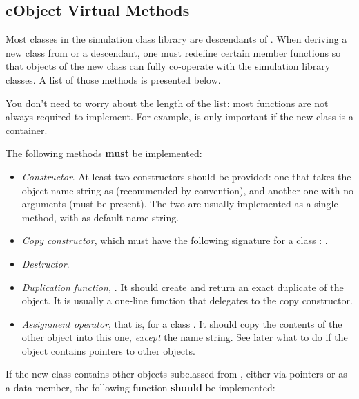 \subsection{cObject Virtual Methods}
\label{sec:sim-lib:cobject-virtual-methods}

Most classes in the simulation class library are descendants of
. When deriving a new class from 
or a  descendant, one must redefine certain member
functions so that objects of the new class can fully co-operate
with the simulation library classes. A list of those methods is
presented below.

\begin{note}
You don't need to worry about the length of the list: most functions
are not always required to implement. For example, 
is only important if the new class is a container.
\end{note}

The following methods \textbf{must} be implemented:

\begin{itemize}
  \item \textit{Constructor}. At least two constructors should be provided:
        one that takes the object name string as 
        (recommended by convention), and another one with no arguments
        (must be present). The two are usually implemented as a single
        method, with  as default name string.
  \item \textit{Copy constructor}, which must have the following signature
        for a class : .
  \item \textit{Destructor}.
  \item \textit{Duplication function,} .
        It should create and return an exact duplicate of the object.
        It is usually a one-line function that delegates to the copy constructor.
  \item \textit{Assignment operator}, that is, 
        for a class . It should copy the contents of the other
        object into this one, \textit{except} the name string. See later what to do
        if the object contains pointers to other objects.
\end{itemize}

If the new class contains other objects subclassed from ,
either via pointers or as a data member, the following function \textbf{should}
be implemented:

